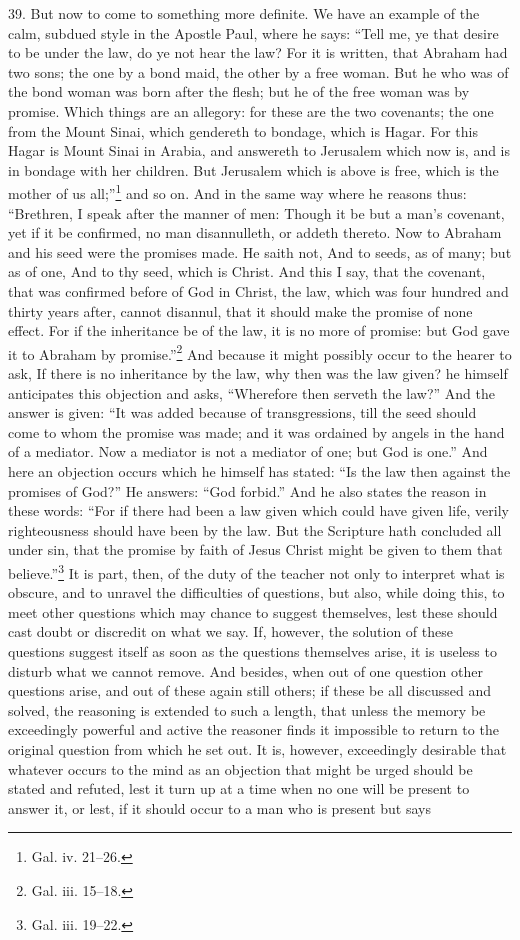 39. But now to come to something more definite. We have an example of the calm, subdued style in the Apostle Paul, where he says: “Tell me, ye that desire to be under the law, do ye not hear the law? For it is written, that Abraham had two sons; the one by a bond maid, the other by a free woman. But he who was of the bond woman was born after the flesh; but he of the free woman was by promise. Which things are an allegory: for these are the two covenants; the one from the Mount Sinai, which gendereth to bondage, which is Hagar. For this Hagar is Mount Sinai in Arabia, and answereth to Jerusalem which now is, and is in bondage with her children. But Jerusalem which is above is free, which is the mother of us all;”\footnote{Gal. iv. 21–26.} and so on. And in the same way where he reasons thus: “Brethren, I speak after the manner of men: Though it be but a man’s covenant, yet if it be confirmed, no man disannulleth, or addeth thereto. Now to Abraham and his seed were the promises made. He saith not, And to seeds, as of many; but as of one, And to thy seed, which is Christ. And this I say, that the covenant, that was confirmed before of God in Christ, the law, which was four hundred and thirty years after, cannot disannul, that it should make the promise of none effect. For if the inheritance be of the law, it is no more of promise: but God gave it to Abraham by promise.”\footnote{Gal. iii. 15–18.} And because it might possibly occur to the hearer to ask, If there is no inheritance by the law, why then was the law given? he himself anticipates this objection and asks, “Wherefore then  serveth the law?” And the answer is given: “It was added because of transgressions, till the seed should come to whom the promise was made; and it was ordained by angels in the hand of a mediator. Now a mediator is not a mediator of one; but God is one.” And here an objection occurs which he himself has stated: “Is the law then against the promises of God?” He answers: “God forbid.” And he also states the reason in these words: “For if there had been a law given which could have given life, verily righteousness should have been by the law. But the Scripture hath concluded all under sin, that the promise by faith of Jesus Christ might be given to them that believe.”\footnote{Gal. iii. 19–22.} It is part, then, of the duty of the teacher not only to interpret what is obscure, and to unravel the difficulties of questions, but also, while doing this, to meet other questions which may chance to suggest themselves, lest these should cast doubt or discredit on what we say. If, however, the solution of these questions suggest itself as soon as the questions themselves arise, it is useless to disturb what we cannot remove. And besides, when out of one question other questions arise, and out of these again still others; if these be all discussed and solved, the reasoning is extended to such a length, that unless the memory be exceedingly powerful and active the reasoner finds it impossible to return to the original question from which he set out. It is, however, exceedingly desirable that whatever occurs to the mind as an objection that might be urged should be stated and refuted, lest it turn up at a time when no one will be present to answer it, or lest, if it should occur to a man who is present but says 